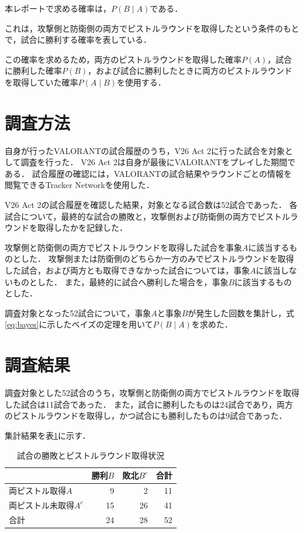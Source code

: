 \documentclass[titlepage,a4paper]{jsarticle}
\begin{document}
本レポートで求める確率は，$P(B \mid A)$である．

これは，攻撃側と防衛側の両方でピストルラウンドを取得したという条件のもとで，試合に勝利する確率を表している．

この確率を求めるため，両方のピストルラウンドを取得した確率$P(A)$，試合に勝利した確率$P(B)$，および試合に勝利したときに両方のピストルラウンドを取得していた確率$P(A \mid B)$を使用する．

\section{調査方法}

自身が行ったVALORANTの試合履歴のうち，V26 Act 2に行った試合を対象として調査を行った．
V26 Act 2は自身が最後にVALORANTをプレイした期間である．
試合履歴の確認には，VALORANTの試合結果やラウンドごとの情報を閲覧できるTracker Networkを使用した\cite{tracker}．

V26 Act 2の試合履歴を確認した結果，対象となる試合数は52試合であった．
各試合について，最終的な試合の勝敗と，攻撃側および防衛側の両方でピストルラウンドを取得したかを記録した．

攻撃側と防衛側の両方でピストルラウンドを取得した試合を事象$A$に該当するものとした．
攻撃側または防衛側のどちらか一方のみでピストルラウンドを取得した試合，および両方とも取得できなかった試合については，事象$A$に該当しないものとした．
また，最終的に試合へ勝利した場合を，事象$B$に該当するものとした．

調査対象となった52試合について，事象$A$と事象$B$が発生した回数を集計し，式\eqref{eq:bayes}に示したベイズの定理を用いて$P(B \mid A)$を求めた．


\section{調査結果}

調査対象とした52試合のうち，攻撃側と防衛側の両方でピストルラウンドを取得した試合は11試合であった．
また，試合に勝利したものは24試合であり，両方のピストルラウンドを取得し，かつ試合にも勝利したものは9試合であった．

集計結果を表\ref{tab:result}に示す．

\begin{table}[htbp]
  \centering
  \caption{試合の勝敗とピストルラウンド取得状況}
  \label{tab:result}
  \begin{tabular}{lrrr}
    \hline
     & 勝利$B$ & 敗北$B^{c}$ & 合計 \\
    \hline
    両ピストル取得$A$       & 9  & 2  & 11 \\
    両ピストル未取得$A^{c}$ & 15 & 26 & 41 \\
    \hline
    合計                     & 24 & 28 & 52 \\
    \hline
  \end{tabular}
\end{table}
\end{document}
